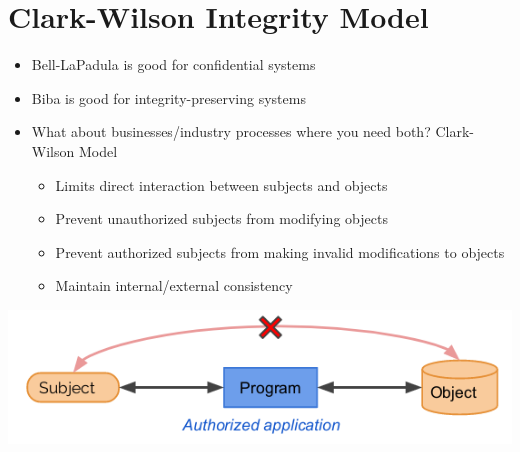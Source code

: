\documentclass{article}[18pt]
\begin{document}
\section{Clark-Wilson Integrity Model}
\begin{itemize}
	\item Bell-LaPadula is good for confidential systems
	\item Biba is good for integrity-preserving systems
	\item What about businesses/industry processes where you need both? Clark-Wilson Model
	\begin{itemize}
		\item Limits direct interaction between subjects and objects
		\item Prevent unauthorized subjects from modifying objects
		\item Prevent authorized subjects from making invalid modifications to objects
		\item Maintain internal/external consistency
	\end{itemize}
\end{itemize}
\begin{center}
	\includegraphics[scale=0.7]{Clark-Wilson}
\end{center}
\end{document}
